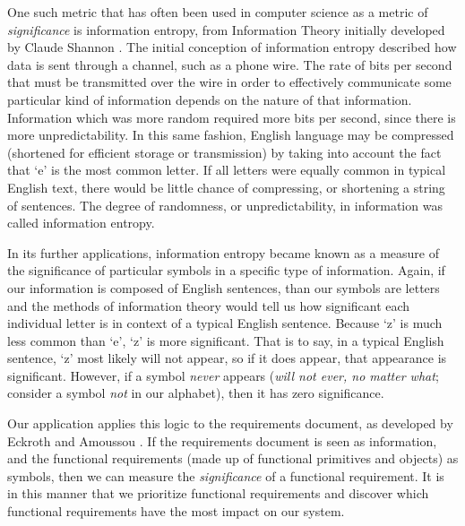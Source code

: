 \documentclass[letterpaper,10pt]{article}
\begin{document}
                One such metric that has often been used in computer
                science as a metric of \emph{significance} is
                information entropy, from Information Theory initially
                developed by Claude Shannon \cite{shannon}. The
                initial conception of information entropy described
                how data is sent through a channel, such as a phone
                wire. The rate of bits per second that must be
                transmitted over the wire in order to effectively
                communicate some particular kind of information
                depends on the nature of that information. Information
                which was more random required more bits per second,
                since there is more unpredictability. In this same
                fashion, English language may be compressed (shortened
                for efficient storage or transmission) by taking into
                account the fact that `e' is the most common
                letter. If all letters were equally common in typical
                English text, there would be little chance of
                compressing, or shortening a string of sentences. The
                degree of randomness, or unpredictability, in
                information was called information entropy.

                In its further applications, information entropy
                became known as a measure of the significance of
                particular symbols in a specific type of
                information. Again, if our information is composed of
                English sentences, than our symbols are letters and
                the methods of information theory would tell us how
                significant each individual letter is in context of a
                typical English sentence. Because `z' is much less
                common than `e', `z' is more significant. That is to
                say, in a typical English sentence, `z' most likely
                will not appear, so if it does appear, that appearance
                is significant. However, if a symbol \emph{never}
                appears (\emph{will not ever, no matter what};
                consider a symbol \emph{not} in our alphabet), then it
                has zero significance.

                Our application applies this logic to the requirements
                document, as developed by Eckroth and Amoussou
                \cite{eckroth}. If the requirements document is seen
                as information, and the functional requirements (made
                up of functional primitives and objects) as symbols,
                then we can measure the \emph{significance} of a
                functional requirement. It is in this manner that we
                prioritize functional requirements and discover which
                functional requirements have the most impact on our
                system.
\end{document}
